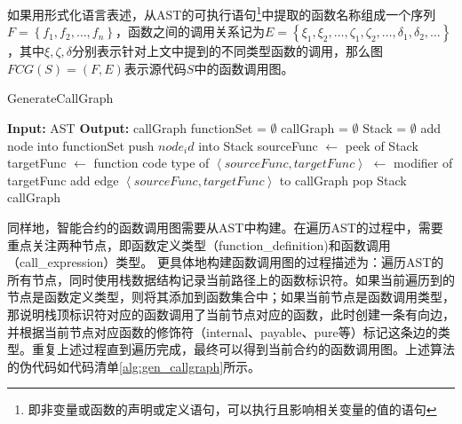 如果用形式化语言表述，从AST的可执行语句\footnote{即非变量或函数的声明或定义语句，可以执行且影响相关变量的值的语句}中提取的函数名称组成一个序列$F=\left\{f_1, f_2, \ldots, f_n\right\}$，函数之间的调用关系记为$E=\left\{\xi_1, \xi_2, \ldots, \zeta_1, \zeta_2, \ldots, \delta_1, \delta_2, \ldots\right\}$，其中$\xi, \zeta, \delta$分别表示针对上文中提到的不同类型函数的调用，那么图$FCG(S)=(F, E)$表示源代码$S$中的函数调用图。%

\begin{algorithm}
    \caption{GenerateCallGraph}
    \label{alg:gen_callgraph}
    \begin{algorithmic}[1]
        \State \textbf{Input:} AST
        \State \textbf{Output:} callGraph
        \State functionSet = $\emptyset$
        \State callGraph = $\emptyset$
        \State Stack = $\emptyset$
                \State add node into functionSet
                \State push $node_id$ into Stack
                    \State sourceFunc $\gets$ peek of Stack
                    \State targetFunc $\gets$ function code
                    \State type of $\left\langle sourceFunc,targetFunc\right\rangle$ $\gets$ modifier of targetFunc
                    \State add edge  $\left\langle sourceFunc,targetFunc\right\rangle$ to callGraph
                \EndIf
            \EndIf
                \State {}
            \EndFor
                \State pop Stack
            \EndIf
        \EndFunction
        \State {}
        \State \Return callGraph
    \end{algorithmic}
    \end{algorithm}

同样地，智能合约的函数调用图需要从AST中构建。在遍历AST的过程中，需要重点关注两种节点，即函数定义类型（function\_definition)和函数调用（call\_expression）类型。
更具体地构建函数调用图的过程描述为：遍历AST的所有节点，同时使用栈数据结构记录当前路径上的函数标识符。如果当前遍历到的节点是函数定义类型，则将其添加到函数集合中；如果当前节点是函数调用类型，那说明栈顶标识符对应的函数调用了当前节点对应的函数，此时创建一条有向边，并根据当前节点对应函数的修饰符（internal、payable、pure等）标记这条边的类型。重复上述过程直到遍历完成，最终可以得到当前合约的函数调用图。上述算法的伪代码如代码清单\ref{alg:gen_callgraph}所示。

